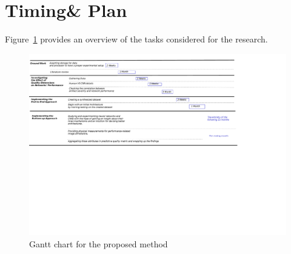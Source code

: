 \documentclass{article}
\begin{document}
\section{Timing\& Plan} \label{sec:timing_plan}
Figure~\ref{fig:gantt} provides an overview of the tasks considered for the research.
\begin{landscape}
\begin{figure}
	\includegraphics[trim=0 14.5cm 8cm 1cm, clip, width = 26cm]{gantt}
	\caption{Gantt chart for the proposed method}
	\label{fig:gantt}
\end{figure}
\end{landscape}


\end{document}
